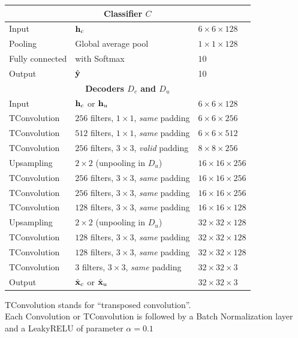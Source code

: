 \begin{table}[htbp]
\begin{threeparttable}
\begin{tabular}{ l l l}
\toprule
\multicolumn{3}{c}{\textbf{Classifier $C$}}\\
\midrule
Input & $\mathbf{h}_c$& $6\times 6\times 128$ \\
Pooling & Global average pool & $1\times 1\times 128$ \\
Fully connected & with Softmax & $10$ \\
Output & $\hat{\mathbf{y}}$ & 10 \\
\toprule
\multicolumn{3}{c}{\textbf{Decoders $D_c$ and $D_u$}}\\
\midrule
Input & $\mathbf{h}_c$ or $\mathbf{h}_u$ & $6\times 6\times 128$ \\
TConvolution & $256$ filters, $1\times1$, \textit{same} padding  & $6\times 6\times 256$ \\
TConvolution & $512$ filters, $1\times1$, \textit{same} padding  & $6\times 6\times 512$ \\
TConvolution & $256$ filters, $3\times3$, \textit{valid} padding  & $8\times 8\times 256$ \\
Upsampling   & $2\times2$ (unpooling in $D_u$)  & $16\times 16\times 256$ \\
TConvolution & $256$ filters, $3\times3$, \textit{same} padding & $16\times 16\times 256$ \\
TConvolution & $256$ filters, $3\times3$, \textit{same} padding & $16\times 16\times 256$ \\
TConvolution & $128$ filters, $3\times3$, \textit{same} padding & $16\times 16\times 128$ \\
Upsampling & $2\times2$ (unpooling in $D_u$) & $32\times 32\times 128$ \\
TConvolution & $128$ filters, $3\times3$, \textit{same} padding  & $32\times 32\times 128$ \\
TConvolution & $128$ filters, $3\times3$, \textit{same} padding  & $32\times 32\times 128$ \\
TConvolution & $3$ filters, $3\times3$, \textit{same} padding  & $32\times 32\times 3$ \\
Output & $\hat{\mathbf{x}}_c$ or $\hat{\mathbf{x}}_u$ & $32\times 32 \times 3$ \\
\bottomrule
\end{tabular}
\begin{tablenotes}
TConvolution stands for ``transposed convolution''.\\ Each Convolution or TConvolution is followed by a Batch Normalization layer and a LeakyRELU of parameter $\alpha = 0.1$
\end{tablenotes}
\end{threeparttable}
\end{table}



